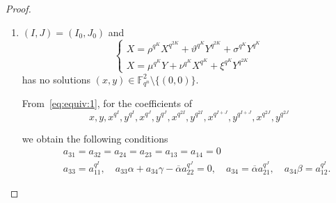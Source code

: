 \begin{proof}
\begin{enumerate}
\begin{itemize}
\begin{itemize}
\item \textbf{Subcase} $J = I + J_0$.
Considering the coefficients of $x$, $ y $, $x^{q^J}$, $ y ^{q^J}$,  $x^{q^{J+J_0}}$, $ y ^{q^{J+J_0}}$, we get
$a_{31} = a_{32} = a_{33} = a_{34} = 0$. 

\item \textbf{Subcase} $J = 2I$ and $J_0\neq 3I$.
Considering the coefficients of $x$, $ y $, $x^{q^J}$, $ y ^{q^J}$,  $x^{q^{I+J}}$, $ y ^{q^{I+J}}$, we get
$a_{31} = a_{32} = a_{33} = a_{34} = 0$.

\item \textbf{Subcase} $J = 2I$ and $J_0= 3I$.
Considering the coefficients of $x$, $ y $, $x^{q^{5I}}$, $ y ^{q^{5I}}$,  $x^{q^{2I}}$, $ y ^{q^{2I}}$, we get
$a_{31} = a_{32} = a_{33} = a_{34} = 0$.
\end{itemize}

\end{itemize}

In all the cases listed above,  the matrix~\eqref{eq:mat:gammaell} 
is not an element of $\mathrm{GL}(4,\mathbb{F}_{q^n})$. Hence the two sets $U_{\alpha, \beta, \gamma}^{I,J,n}$ and $U_{\overline{\alpha}, \overline{\beta}, \overline{\gamma}}^{I_0,J_0,n}$ are not $\textrm{GL}(4,q^n)$-equivalent.
\item  $(I,J)= (I_0, J_0)$ and 
    $$
    \begin{cases}
    X = \rho^{q^K}X^{q^{2K}} + \vartheta^{q^K}Y^{q^{2K}} + \sigma^{q^K}Y^{q^K}\\
    X = \mu^{q^K}Y + \nu^{q^K}X^{q^K} + \xi^{q^K}Y^{q^{2K}}
    \end{cases}
    $$
    has no solutions $(x,y)\in \mathbb{F}_{q^n}^2\setminus\{(0,0)\}$.

From~\eqref{eq:equiv:1},  for the coefficients of $$x,  y , x^{q^I},  y ^{q^I}, x^{q^J},  y ^{q^J}, x^{q^{2I}},  y ^{q^{2I}}, x^{q^{I+J}},  y ^{q^{I+J}}, x^{q^{2J}},  y ^{q^{2J}}$$

we obtain the following conditions
\begin{eqnarray}
\label{system:1}
        &&a_{31} = a_{32} = a_{24} = a_{23} = a_{13} = a_{14} = 0\nonumber \\
        &&a_{33} = a_{11}^{q^I}, \quad 
        a_{33}\alpha + a_{34}\gamma - \overline{\alpha}a_{22}^{q^J} = 0, \quad 
        a_{34} = \overline{\alpha}a_{21}^{q^J}, \quad
        a_{34}\beta = a_{12}^{q^I}.
\end{eqnarray}


\end{enumerate}
\end{proof}
